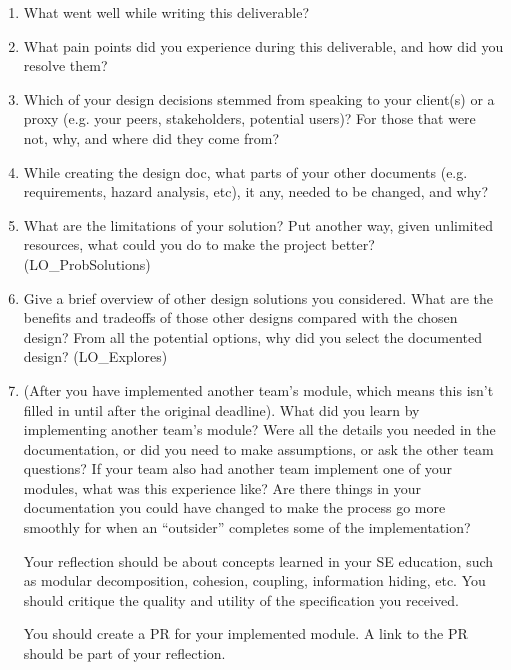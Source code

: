 \documentclass[12pt, titlepage]{article}
\begin{document}
\begin{enumerate}
  \item What went well while writing this deliverable?
  \item What pain points did you experience during this deliverable, and how
    did you resolve them?
  \item Which of your design decisions stemmed from speaking to your client(s)
  or a proxy (e.g. your peers, stakeholders, potential users)? For those that
  were not, why, and where did they come from?
  \item While creating the design doc, what parts of your other documents (e.g.
  requirements, hazard analysis, etc), it any, needed to be changed, and why?
  \item What are the limitations of your solution?  Put another way, given
  unlimited resources, what could you do to make the project better? (LO\_ProbSolutions)
  \item Give a brief overview of other design solutions you considered.  What
  are the benefits and tradeoffs of those other designs compared with the chosen
  design?  From all the potential options, why did you select the documented design?
  (LO\_Explores)
  \item (After you have implemented another team's module, which means this
  isn't filled in until after the original deadline). What did you learn by
  implementing another team's module? Were all the details you needed in the
  documentation, or did you need to make assumptions, or ask the other team
  questions?  If your team also had another team implement one of your modules,
  what was this experience like?  Are there things in your documentation you
  could have changed to make the process go more smoothly for when an
  ``outsider'' completes some of the implementation?

  Your reflection should be about concepts learned in your SE education, such as modular decomposition, cohesion, coupling, information hiding, etc.  You should critique the quality and utility of the specification you received.

  You should create a PR for your implemented module.  A link to the PR should be part of your reflection.

\end{enumerate}

\newpage



\end{document}
